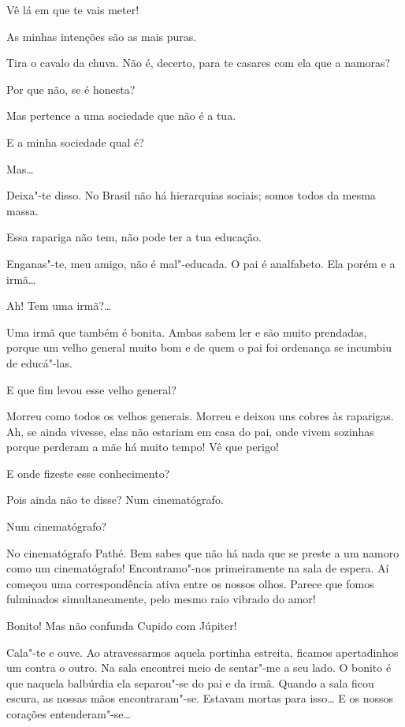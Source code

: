  Vê lá em que te vais meter!

 As minhas intenções são as mais puras.

 Tira o cavalo da chuva. Não é,
decerto, para te casares com ela que a namoras?

 Por que não, se é honesta?

 Mas pertence a uma sociedade que não é a tua.

 E a minha sociedade qual é?

 Mas\ldots{}

 Deixa"-te
disso. No Brasil não há hierarquias sociais; somos
todos da mesma massa.

 Essa rapariga não tem,
não pode ter a tua educação.

 Enganas"-te, meu
amigo, não é mal"-educada. O pai é analfabeto. Ela
porém e a irmã\ldots{}

 Ah! Tem uma irmã?\ldots{}

 Uma irmã
que também é bonita. Ambas sabem ler e são muito
prendadas, porque um velho general muito bom e de quem o pai
foi ordenança se incumbiu de educá"-las.

 E que fim levou
esse velho general?

 Morreu como todos
os velhos generais. Morreu e deixou uns cobres às
raparigas. Ah, se ainda vivesse, elas não estariam
em casa do pai, onde vivem sozinhas porque perderam a
mãe há muito tempo! Vê que perigo!

 E onde fizeste esse
conhecimento?

 Pois ainda
não te disse? Num cinematógrafo.

 Num cinematógrafo?

 No
cinematógrafo Pathé. Bem sabes que não há
nada que se preste a um namoro como um
cinematógrafo! Encontramo"-nos primeiramente na sala
de espera. Aí começou uma correspondência
ativa entre os nossos olhos. Parece que fomos fulminados
simultaneamente, pelo mesmo raio vibrado do amor!

 Bonito! Mas
não confunda Cupido com Júpiter!

 Cala"-te e ouve. Ao
atravessarmos aquela portinha estreita, ficamos apertadinhos um contra
o outro. Na sala encontrei meio de sentar"-me a seu lado. O bonito
é que naquela balbúrdia ela separou"-se do pai e da
irmã. Quando a sala ficou escura, as nossas
mãos encontraram"-se. Estavam mortas para isso\ldots{} E os
nossos corações entenderam"-se\ldots{}

